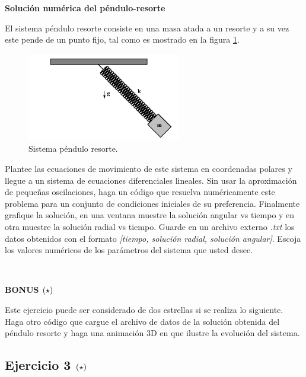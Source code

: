 \textbf{Solución numérica del péndulo-resorte}

El sistema péndulo resorte consiste en una masa atada a un resorte y a su 
vez este pende de un punto fijo, tal como es mostrado en la figura 
\ref{fig:pendulum_spring}.


\begin{figure}[htbp]
	\centering
	\includegraphics[width=0.60\textwidth]
	{./pictures/pendulum_spring.png}

	\caption{\small{Sistema péndulo resorte.}}
	
	\label{fig:pendulum_spring}
\end{figure}

Plantee las ecuaciones de movimiento de este sistema en coordenadas polares y 
llegue a un sistema de ecuaciones diferenciales lineales. Sin usar la 
aproximación de pequeñas oscilaciones, haga un código que resuelva 
numéricamente este problema para un conjunto de condiciones iniciales de su 
preferencia. Finalmente grafique la solución, en una ventana muestre la solución
angular vs tiempo y en otra muestre la solución radial vs tiempo. Guarde en
un archivo externo \textit{.txt} los datos obtenidos con el formato 
\textit{[tiempo, solución radial, solución angular]}.
Escoja los valores numéricos de los parámetros del sistema que usted desee.

\

\textbf{BONUS \large{$\left( \star \right)$}}

Este ejercicio puede ser considerado de dos estrellas si se realiza lo siguiente.
Haga otro código que cargue el archivo de datos de la solución obtenida del 
péndulo resorte y haga una animación 3D en \mayavi que ilustre la evolución del 
sistema.

\newpage
\subsection*{Ejercicio 3 \large{$\left( \star \right)$}}

